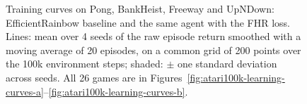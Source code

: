 \begin{figure}[t]
  \centering
  
  \caption{Training curves on Pong, BankHeist, Freeway and UpNDown: EfficientRainbow baseline and the same agent with the FHR loss. Lines: mean over 4 seeds of the raw episode return smoothed with a moving average of 20 episodes, on a common grid of 200 points over the 100k environment steps; shaded: $\pm$ one standard deviation across seeds. All 26 games are in Figures~\ref{fig:atari100k-learning-curves-a}--\ref{fig:atari100k-learning-curves-b}.}
  \label{fig:atari100k-learning-curves-showcase}
\end{figure}
